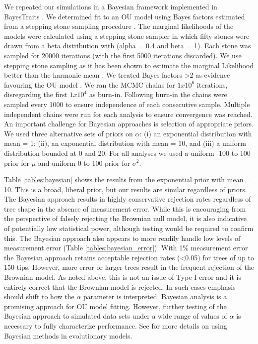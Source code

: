 \documentclass[a4paper,12pt]{article}
\begin{document}
\begin{enumerate}[(i)]
	    We repeated our simulations in a Bayesian framework implemented in BayesTraits \citep{pagel2013bayestraits}. 
      We determined fit to an OU model using Bayes factors estimated from a stepping stone sampling procedure \citep{xie2010improving}. 
      The marginal likelihoods of the models were calculated using a stepping stone sampler in which fifty stones were drawn from a beta distribution with (alpha = 0.4 and beta = 1). 
      Each stone was sampled for 20000 iterations (with the first 5000 iterations discarded). 
      We use stepping stone sampling as it has been shown to estimate the marginal Likelihood better than the harmonic mean \citep{baele2012improving}. 
      We treated Bayes factors \textgreater 2 as evidence favouring the OU model \citep{kass1995bayes}. 
      We ran the MCMC chains for $1x10^6$ iterations, disregarding the first $1x10^4$ as burn-in.
      Following burn-in the chains were sampled every 1000 to ensure independence of each consecutive sample. 
      Multiple independent chains were run for each analysis to ensure convergence was reached. 
      An important challenge for Bayesian approaches is selection of appropriate priors. We used three alternative sets of priors on $\alpha$: (i) an exponential distribution with mean = 1; (ii), an exponential distribution with mean = 10, and (iii) a uniform distribution bounded at 0 and 20. 
      For all analyses we used a uniform -100 to 100 prior for $\mu$ and uniform 0 to 100 prior for $\sigma^2$. 
      
      Table \ref{tables:bayesian} shows the results from the exponential prior with mean = 10. 
      This is a broad, liberal prior, but our results are similar regardless of priors. %
      The Bayesian approach results in highly conservative rejection rates regardless of tree shape in the absence of measurement error. 
      While this is encouraging from the perspective of falsely rejecting the Brownian null model, it is also indicative of potentially low statistical power, although testing would be required to confirm this. 
      The Bayesian approach also appears to more readily handle low levels of measurement error (Table \ref{tables:bayesian_error}). 
      With 1\% measurement error the Bayesian approach retains acceptable rejection rates (\textless 0.05) for trees of up to 150 tips. 
      However, more error or larger trees result in the frequent rejection of the Brownian model. 
      As noted above, this is not an issue of Type I error and it is entirely correct that the Brownian model is rejected. 
      In such cases emphasis should shift to how the $\alpha$ parameter is interpreted. 
      Bayesian analysis is a promising approach for OU model fitting. 
      However, further testing of the Bayesian approach to simulated data sets under a wide range of values of $\alpha$ is necessary to fully characterize performance. 
      See \citet{pennell2015model} for more details on using Bayesian methods in evolutionary models.
    \end{enumerate}
\end{document}
